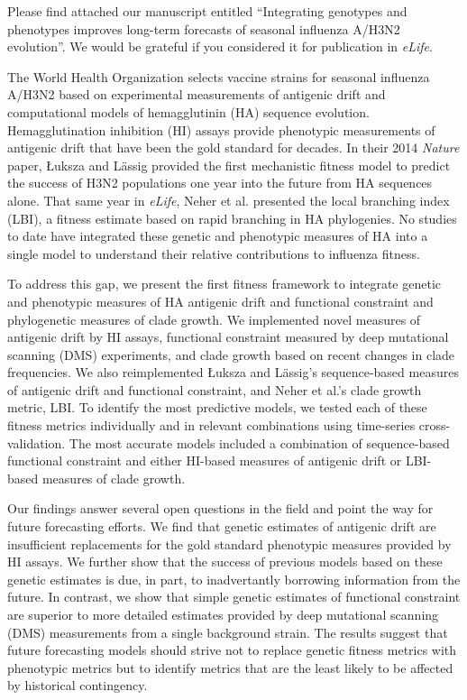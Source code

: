 \documentclass[stdletter,letterpaper,addrfromright,orderfromdateto,dateleft,11pt,noaddrto,sigleft]{newlfm}
\begin{document}
\begin{newlfm}
  Please find attached our manuscript entitled ``Integrating genotypes and phenotypes improves long-term forecasts of seasonal influenza A/H3N2 evolution''.
  We would be grateful if you considered it for publication in \textit{eLife}.

  The World Health Organization selects vaccine strains for seasonal influenza A/H3N2 based on experimental measurements of antigenic drift and computational models of hemagglutinin (HA) sequence evolution.
  Hemagglutination inhibition (HI) assays provide phenotypic measurements of antigenic drift that have been the gold standard for decades.
  In their 2014 \textit{Nature} paper, {\L}uksza and L\"assig provided the first mechanistic fitness model to predict the success of H3N2 populations one year into the future from HA sequences alone.
  That same year in \textit{eLife}, Neher et al. presented the local branching index (LBI), a fitness estimate based on rapid branching in HA phylogenies.
  No studies to date have integrated these genetic and phenotypic measures of HA into a single model to understand their relative contributions to influenza fitness.

  To address this gap, we present the first fitness framework to integrate genetic and phenotypic measures of HA antigenic drift and functional constraint and phylogenetic measures of clade growth.
  We implemented novel measures of antigenic drift by HI assays, functional constraint measured by deep mutational scanning (DMS) experiments, and clade growth based on recent changes in clade frequencies.
  We also reimplemented {\L}uksza and L\"assig's sequence-based measures of antigenic drift and functional constraint, and Neher et al.'s clade growth metric, LBI.
  To identify the most predictive models, we tested each of these fitness metrics individually and in relevant combinations using time-series cross-validation.
  The most accurate models included a combination of sequence-based functional constraint and either HI-based measures of antigenic drift or LBI-based measures of clade growth.

  Our findings answer several open questions in the field and point the way for future forecasting efforts.
  We find that genetic estimates of antigenic drift are insufficient replacements for the gold standard phenotypic measures provided by HI assays.
  We further show that the success of previous models based on these genetic estimates is due, in part, to inadvertantly borrowing information from the future.
  In contrast, we show that simple genetic estimates of functional constraint are superior to more detailed estimates provided by deep mutational scanning (DMS) measurements from a single background strain.
  The results suggest that future forecasting models should strive not to replace genetic fitness metrics with phenotypic metrics but to identify metrics that are the least likely to be affected by historical contingency.


\end{newlfm}
\end{document}
